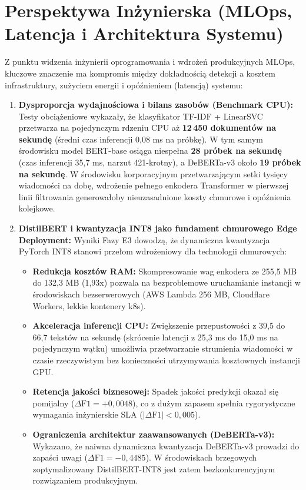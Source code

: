 \documentclass[12pt,a4paper,twoside]{report}
\begin{document}
\section{Perspektywa Inżynierska (MLOps, Latencja i Architektura Systemu)}\label{sec:eng}
Z punktu widzenia inżynierii oprogramowania i wdrożeń produkcyjnych MLOps, kluczowe znaczenie ma kompromis między dokładnością detekcji a kosztem infrastruktury, zużyciem energii i opóźnieniem (latencją) systemu:

\begin{enumerate}[leftmargin=1.5em]
  \item \textbf{Dysproporcja wydajnościowa i bilans zasobów (Benchmark CPU):} Testy obciążeniowe wykazały, że klasyfikator TF-IDF + LinearSVC przetwarza na pojedynczym rdzeniu CPU aż \textbf{12\,450 dokumentów na sekundę} (średni czas inferencji 0,08 ms na próbkę). W tym samym środowisku model BERT-base osiąga niespełna \textbf{28 próbek na sekundę} (czas inferencji 35,7 ms, narzut 421-krotny), a DeBERTa-v3 około \textbf{19 próbek na sekundę}. W środowisku korporacyjnym przetwarzającym setki tysięcy wiadomości na dobę, wdrożenie pełnego enkodera Transformer w pierwszej linii filtrowania generowałoby nieuzasadnione koszty chmurowe i opóźnienia kolejkowe.

  \item \textbf{DistilBERT i kwantyzacja INT8 jako fundament chmurowego Edge Deployment:} Wyniki Fazy E3 dowodzą, że dynamiczna kwantyzacja PyTorch INT8 stanowi przełom wdrożeniowy dla technologii chmurowych:
  \begin{itemize}
    \item \textbf{Redukcja kosztów RAM:} Skompresowanie wag enkodera ze 255,5 MB do 132,3 MB (1,93x) pozwala na bezproblemowe uruchamianie instancji w środowiskach bezserwerowych (AWS Lambda 256 MB, Cloudflare Workers, lekkie kontenery k8s).
    \item \textbf{Akceleracja inferencji CPU:} Zwiększenie przepustowości z 39,5 do 66,7 tekstów na sekundę (skrócenie latencji z 25,3 ms do 15,0 ms na pojedynczym wątku) umożliwia przetwarzanie strumienia wiadomości w czasie rzeczywistym bez konieczności utrzymywania kosztownych instancji GPU.
    \item \textbf{Retencja jakości biznesowej:} Spadek jakości predykcji okazał się pomijalny ($\Delta\text{F1} = +0,0048$), co z dużym zapasem spełnia rygorystyczne wymagania inżynierskie SLA ($|\Delta\text{F1}| < 0,005$).
    \item \textbf{Ograniczenia architektur zaawansowanych (DeBERTa-v3):} Wykazano, że naiwna dynamiczna kwantyzacja DeBERTa-v3 prowadzi do zapaści uwagi ($\Delta\text{F1} = -0,4485$). W środowiskach brzegowych zoptymalizowany DistilBERT-INT8 jest zatem bezkonkurencyjnym rozwiązaniem produkcyjnym.
  \end{itemize}


\end{enumerate}
\end{document}
